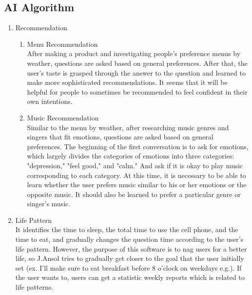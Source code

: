 \documentclass[conference]{IEEEtran}
\begin{document}
\subsection{AI Algorithm}
    \begin{enumerate}
        \item Recommendation
        \begin{enumerate}
            \item Menu Recommendation\\
            After making a product and investigating people's preference menus by weather, questions are asked based on general preferences. After that, the user's taste is grasped through the answer to the question and learned to make more sophisticated recommendations. It seems that it will be helpful for people to sometimes be recommended to feel confident in their own intentions.\\
            
            \item Music Recommendation\\
            Similar to the menu by weather, after researching music genres and singers that fit emotions, questions are asked based on general preferences. The beginning of the first conversation is to ask for emotions, which largely divides the categories of emotions into three categories: "depression," "feel good," and "calm." And ask if it is okay to play music corresponding to each category. At this time, it is necessary to be able to learn whether the user prefers music similar to his or her emotions or the opposite music. It should also be learned to prefer a particular genre or singer's music.\\
            
        \end{enumerate}
        \item Life Pattern\\
        It identifies the time to sleep, the total time to use the cell phone, and the time to eat, and gradually changes the question time according to the user's life pattern. However, the purpose of this software is to nag users for a better life, so J.Ansol tries to gradually get closer to the goal that the user initially set (ex. I'll make sure to eat breakfast before 8 o'clock on weekdays e.g.). If the user wants to, users can get a statistic weekly reports which is related to life patterns.\\
    \end{enumerate}
\end{document}
